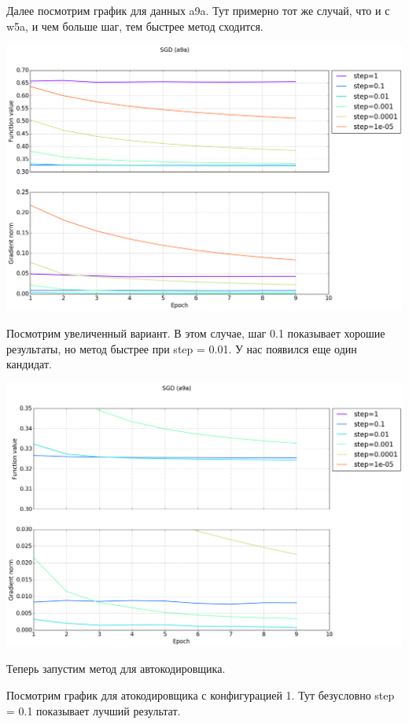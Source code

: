 \documentclass[12pt, a4paper]{article}
\begin{document}
    Далее посмотрим график для данных a9a. Тут примерно тот же случай, что и с w5a, и чем больше шаг, тем быстрее метод сходится.

    \begin{center}\includegraphics[width=\picwidth]{sgd_a9a.png}\end{center}

    Посмотрим увеличенный вариант. В этом случае, шаг 0.1 показывает хорошие результаты, но метод быстрее при step = 0.01. У нас появился еще один кандидат.

    \begin{center}\includegraphics[width=\picwidth]{sgd_a9a_zoomed.png}\end{center}

    Теперь запустим метод для автокодировщика.

    Посмотрим график для атокодировщика с конфигурацией 1. Тут безусловно step = 0.1 показывает лучший результат.
\end{document}
